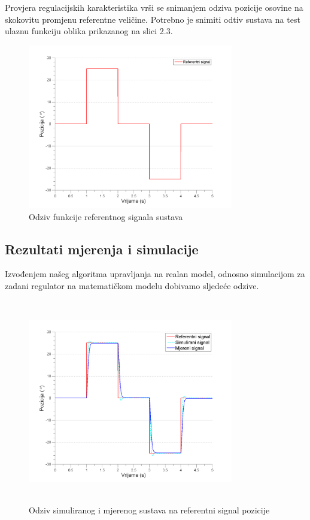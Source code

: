 \documentclass[12pt,a4paper]{article}
\begin{document}
Provjera regulacijskih karakteristika vrši se snimanjem odziva pozicije osovine na skokovitu promjenu referentne veličine. Potrebno je snimiti odtiv sustava na test ulaznu funkciju oblika prikazanog na slici 2.3.


\begin{figure}[h]
	\begin{center}
	\includegraphics[width=0.8\textwidth] {ref.png}
    \caption{Odziv funkcije referentnog signala sustava}
    \end{center}
\end{figure}

\newpage

\subsection{Rezultati mjerenja i simulacije}

Izvođenjem našeg algoritma upravljanja na realan model, odnosno simulacijom za zadani regulator na matematičkom modelu dobivamo sljedeće odzive.

\begin{figure}[h]
	\begin{center}
	\includegraphics[width=0.8\textwidth, height = 3.5in]{odziv_ref_sim_real.png}
    \caption{Odziv simuliranog i mjerenog sustava na referentni signal pozicije}
    \end{center}
\end{figure}
\end{document}
